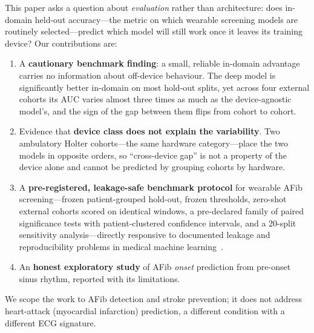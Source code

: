 \documentclass[]{ws-procs9x6}
\begin{document}
This paper asks a question about \emph{evaluation} rather than architecture: does
in-domain held-out accuracy---the metric on which wearable screening models are
routinely selected---predict which model will still work once it leaves its
training device? Our contributions are:
\begin{enumerate}
  \item A \textbf{cautionary benchmark finding}: a small, reliable in-domain
  advantage carries no information about off-device behaviour. The deep model is
  significantly better in-domain on most hold-out splits, yet across four external
  cohorts its AUC varies almost three times as much as the device-agnostic model's,
  and the sign of the gap between them flips from cohort to cohort.
  \item Evidence that \textbf{device class does not explain the variability}. Two
  ambulatory Holter cohorts---the same hardware category---place the two models in
  opposite orders, so ``cross-device gap'' is not a property of the device alone
  and cannot be predicted by grouping cohorts by hardware.
  \item A \textbf{pre-registered, leakage-safe benchmark protocol} for wearable
  AFib screening---frozen patient-grouped hold-out, frozen thresholds, zero-shot
  external cohorts scored on identical windows, a pre-declared family of paired
  significance tests with patient-clustered confidence intervals, and a 20-split
  sensitivity analysis---directly responsive to documented leakage and
  reproducibility problems in medical machine learning~\cite{kapoor2023leakage}.
  \item An \textbf{honest exploratory study} of AFib \emph{onset} prediction from
  pre-onset sinus rhythm, reported with its limitations.
\end{enumerate}
We scope the work to AFib detection and stroke prevention; it does not address
heart-attack (myocardial infarction) prediction, a different condition with a
different ECG signature.
\end{document}
